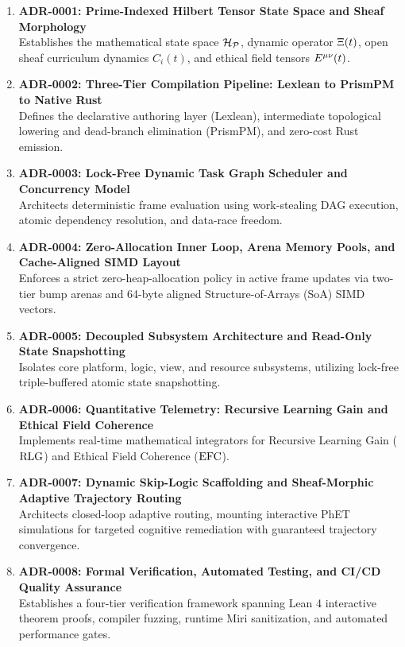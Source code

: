 \documentclass[11pt,a4paper]{article}
\begin{document}
\begin{enumerate}
    \item \textbf{ADR-0001: Prime-Indexed Hilbert Tensor State Space and Sheaf Morphology} \\
    Establishes the mathematical state space $\mathcal{H}_{\mathcal{P}}$, dynamic operator $\Xi(t)$, open sheaf curriculum dynamics $C_i(t)$, and ethical field tensors $E^{\mu\nu}(t)$.
    \item \textbf{ADR-0002: Three-Tier Compilation Pipeline: Lexlean to PrismPM to Native Rust} \\
    Defines the declarative authoring layer (Lexlean), intermediate topological lowering and dead-branch elimination (PrismPM), and zero-cost Rust emission.
    \item \textbf{ADR-0003: Lock-Free Dynamic Task Graph Scheduler and Concurrency Model} \\
    Architects deterministic frame evaluation using work-stealing DAG execution, atomic dependency resolution, and data-race freedom.
    \item \textbf{ADR-0004: Zero-Allocation Inner Loop, Arena Memory Pools, and Cache-Aligned SIMD Layout} \\
    Enforces a strict zero-heap-allocation policy in active frame updates via two-tier bump arenas and 64-byte aligned Structure-of-Arrays (SoA) SIMD vectors.
    \item \textbf{ADR-0005: Decoupled Subsystem Architecture and Read-Only State Snapshotting} \\
    Isolates core platform, logic, view, and resource subsystems, utilizing lock-free triple-buffered atomic state snapshotting.
    \item \textbf{ADR-0006: Quantitative Telemetry: Recursive Learning Gain and Ethical Field Coherence} \\
    Implements real-time mathematical integrators for Recursive Learning Gain ($\mathrm{RLG}$) and Ethical Field Coherence ($\mathrm{EFC}$).
    \item \textbf{ADR-0007: Dynamic Skip-Logic Scaffolding and Sheaf-Morphic Adaptive Trajectory Routing} \\
    Architects closed-loop adaptive routing, mounting interactive PhET simulations for targeted cognitive remediation with guaranteed trajectory convergence.
    \item \textbf{ADR-0008: Formal Verification, Automated Testing, and CI/CD Quality Assurance} \\
    Establishes a four-tier verification framework spanning Lean 4 interactive theorem proofs, compiler fuzzing, runtime Miri sanitization, and automated performance gates.
\end{enumerate}
\end{document}
